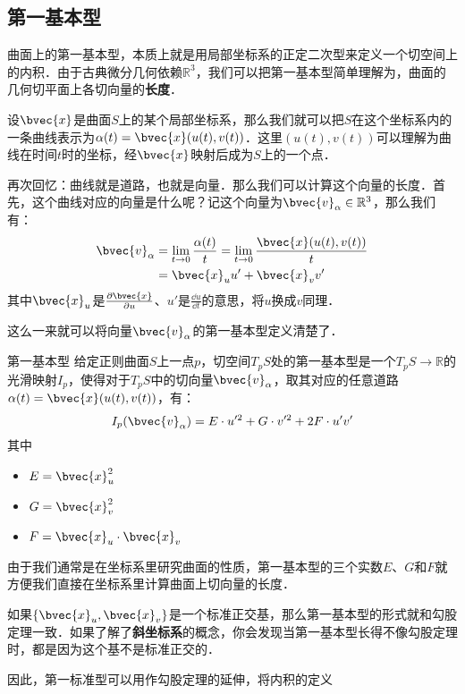 

\subsection{第一基本型}

曲面上的第一基本型，本质上就是用局部坐标系的正定二次型来定义一个切空间上的内积．由于古典微分几何依赖$\mathbb{R}^3$，我们可以把第一基本型简单理解为，曲面的几何切平面上各切向量的\textbf{长度}．

设$\bvec{x}$是曲面$S$上的某个局部坐标系，那么我们就可以把$S$在这个坐标系内的一条曲线表示为$\alpha(t)=\bvec{x}(u(t), v(t))$．这里$(u(t), v(t))$可以理解为曲线在时间$t$时的坐标，经$\bvec{x}$映射后成为$S$上的一个点．

再次回忆：曲线就是道路，也就是向量．那么我们可以计算这个向量的长度．首先，这个曲线对应的向量是什么呢？记这个向量为$\bvec{v}_\alpha\in\mathbb{R}^3$，那么我们有：
\begin{equation}
\begin{aligned}
\bvec{v}_\alpha&=\lim\limits_{t\to 0}\frac{\alpha(t)}{t}=\lim\limits_{t\to 0}\frac{\bvec{x}(u(t), v(t))}{t}\\
&=\bvec{x}_uu'+\bvec{x}_vv'
\end{aligned}
\end{equation}
其中$\bvec{x}_u$是$\frac{\partial\bvec{x}}{\partial u}$、$u'$是$\frac{\dd u}{\dd t}$的意思，将$u$换成$v$同理．

这么一来就可以将向量$\bvec{v}_\alpha$的第一基本型定义清楚了．

\begin{definition}{第一基本型}
给定正则曲面$S$上一点$p$，切空间$T_pS$处的第一基本型是一个$T_pS\to \mathbb{R}$的光滑映射$I_p$，使得对于$T_pS$中的切向量$\bvec{v}_\alpha$，取其对应的任意道路$\alpha(t)=\bvec{x}(u(t), v(t))$，有：$$I_p(\bvec{v}_\alpha)=E\cdot u'^2+G\cdot v'^2+ 2F\cdot u'v'$$
其中
\begin{itemize}
\item $E=\bvec{x}_u^2$
\item $G=\bvec{x}_v^2$
\item $F=\bvec{x}_u\cdot\bvec{x}_v$
\end{itemize}
\end{definition}

由于我们通常是在坐标系里研究曲面的性质，第一基本型的三个实数$E$、$G$和$F$就方便我们直接在坐标系里计算曲面上切向量的长度．

如果$\{\bvec{x}_u, \bvec{x}_v\}$是一个标准正交基，那么第一基本型的形式就和勾股定理一致．如果了解了\textbf{斜坐标系}的概念，你会发现当第一基本型长得不像勾股定理时，都是因为这个基不是标准正交的．

因此，第一标准型可以用作勾股定理的延伸，将内积的定义



